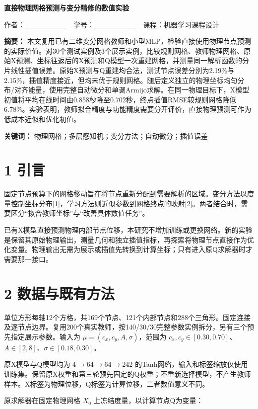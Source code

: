 \documentclass[UTF8,a4paper,zihao=5,fontset=fandol]{ctexart}
\begin{document}
\begin{center}{\LARGE\bfseries 直接物理网格预测与变分精修的数值实验}\end{center}

作者：\_\_\_\_\_\_\_\_　学号：\_\_\_\_\_\_\_\_　课程：机器学习课程设计


\textbf{摘要：} 本文复用已有二维变分网格教师和小型MLP，检验直接使用物理节点预测的实际价值。对30个测试实例及3个展示实例，比较规则网格、教师物理网格、原始X预测、坐标往返后的X预测和Q模型一次重建网格，并测量同一解析函数的分片线性插值误差。原始X预测与Q重建均合法，测试节点误差分别为2.19\%与2.15\%，插值精度接近，但均未优于规则网格。随后定义独立的物理坐标均匀分布/对齐能量，使用完整自动微分和单调Armijo求解。在同一物理目标下，X模型初值将平均在线时间由0.858秒降至0.702秒，终点插值RMSE较规则网格降低6.78\%。实验表明，教师拟合精度与功能精度需要分开评价，直接物理预测可作为低成本近似和优化初值。


\textbf{关键词：} 物理网格；多层感知机；变分方法；自动微分；插值误差


\section*{1 引言}

固定节点预算下的网格移动旨在将节点重新分配到需要解析的区域。变分方法以度量控制坐标分布[1]，学习方法则近似参数到网格终点的映射[2]。两者结合时，需要区分“拟合教师坐标”与“改善具体数值任务”。


已有X模型直接预测物理内部节点位移，本研究不增加训练或更换网络。新的实验是保留其原始物理输出，测量几何和独立插值指标，再探索将物理节点直接作为优化变量。物理输出无需为展示或插值先转换到计算坐标；只有进入原Q求解器时才需要那一接口。


\section*{2 数据与既有方法}

单位方形每轴12个方格，共169个节点、121个内部节点和288个三角形。固定连接及逐节点边界。复用200个真实教师，按140/30/30完整参数实例拆分，另有三个预先指定展示参数。输入为 $\mu=(c_x,c_y,A,\sigma)$，范围为 $c_x,c_y\in[0.30,0.70]$、$A\in[2,8]$、$\sigma\in[0.18,0.30]$。


原X模型与Q模型均为 $4\to64\to64\to242$ 的Tanh网络，输入和标签缩放仅使用训练集。保留原X权重和第三轮预先固定的Q权重；不重新选择模型，不产生教师样本。X标签为物理位移，Q标签为计算位移，二者数值意义不同。


原求解器在固定物理网格 $X_0$ 上冻结度量，以计算节点Q为变量：
\end{document}
